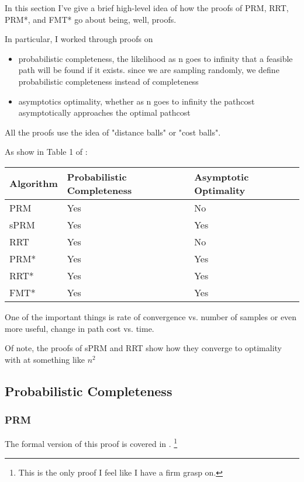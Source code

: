 \documentclass[a4paper]{article}
\begin{document}
In this section I've give a brief high-level idea of how the proofs of PRM,
RRT, PRM*, and FMT* go about being, well, proofs.

In particular, I worked through proofs on 
\begin{itemize}
    \item probabilistic completeness, the likelihood as n goes to infinity that
        a feasible path will be found if it exists. since we are sampling
        randomly, we define probabilistic completeness instead of completeness
    \item asymptotics optimality, whether as n goes to infinity the pathcost
        asymptotically approaches the optimal pathcost
\end{itemize}

All the proofs use the idea of "distance balls" or "cost balls".

As show in Table 1 of \cite{RRT*}:

\begin{tabular}{ | l | p{2.5cm} | p{2cm} |}
    \hline
    Algorithm & Probabilistic Completeness  & Asymptotic Optimality  \\
    \hline
    PRM     & Yes & No  \\
    sPRM    & Yes & Yes \\
    RRT     & Yes & No \\
    \hline
    PRM*    & Yes & Yes  \\
    RRT*    & Yes & Yes \\
    FMT*    & Yes & Yes \\
    \hline
\end{tabular}

One of the important things is rate of convergence vs. number of samples or even
more useful, change in path cost vs. time.

Of note, the proofs of sPRM and RRT show how they converge to optimality with
at something like $n^2$ 

\subsection{Probabilistic Completeness}

\subsubsection{PRM}

The formal version of this proof is covered in \cite{PRM}.  \footnote{This is
the only proof I feel like I have a firm grasp on.}
\end{document}
